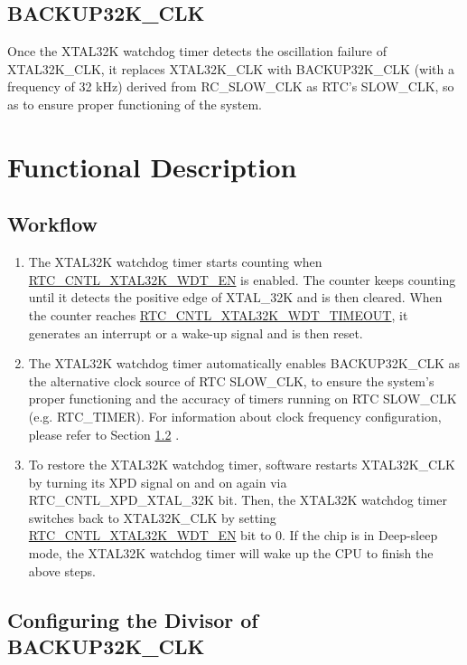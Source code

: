 \documentclass[main\_\_EN.tex]{subfiles}
\begin{document}
\subsection{BACKUP32K\_CLK}

Once the XTAL32K watchdog timer detects the oscillation failure of XTAL32K\_CLK, it replaces XTAL32K\_CLK with BACKUP32K\_CLK (with a frequency of 32 kHz) derived from RC\_SLOW\_CLK as RTC’s SLOW\_CLK, so as to ensure proper functioning of the system.

\section{Functional Description}

\subsection{Workflow}

\begin{enumerate}
    \item The XTAL32K watchdog timer starts counting when \hyperref[fielddesc:RTCCNTLXTAL32KWDTEN]{RTC\_CNTL\_XTAL32K\_WDT\_EN} is enabled. The counter keeps counting until it detects the positive edge of XTAL\_32K and is then cleared. When the counter reaches \hyperref[fielddesc:RTCCNTLXTAL32KWDTTIMEOUT]{RTC\_CNTL\_XTAL32K\_WDT\_TIMEOUT}, it generates an interrupt or a wake-up signal and is then reset.
    \item The XTAL32K watchdog timer automatically enables BACKUP32K\_CLK as the alternative clock source of RTC SLOW\_CLK, to ensure the system’s proper functioning and the accuracy of timers running on RTC SLOW\_CLK (e.g. RTC\_TIMER). For information about clock frequency configuration, please refer to Section \ref{subsubsection:divisor_configuration} \textit{}.
    \item To restore the XTAL32K watchdog timer, software restarts XTAL32K\_CLK by turning its XPD signal on and on again via RTC\_CNTL\_XPD\_XTAL\_32K bit. Then, the XTAL32K watchdog timer switches back to XTAL32K\_CLK by setting \hyperref[fielddesc:RTCCNTLXTAL32KWDTEN]{RTC\_CNTL\_XTAL32K\_WDT\_EN} bit to 0. If the chip is in Deep-sleep mode, the XTAL32K watchdog timer will wake up the CPU to finish the above steps.
\end{enumerate}

\subsection{Configuring the Divisor of BACKUP32K\_CLK}\label{subsubsection:divisor_configuration}
\end{document}
